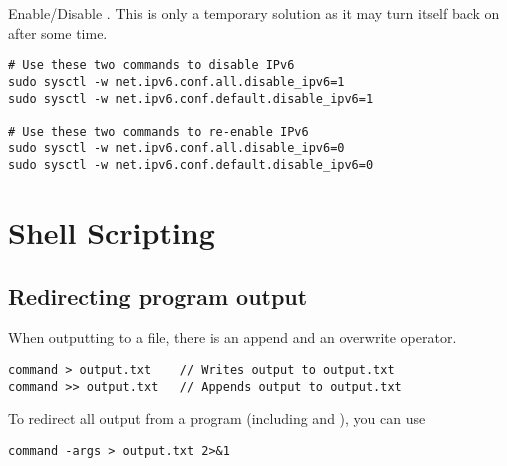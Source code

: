 Enable/Disable . This is only a temporary solution as it may turn itself back on after some time.
\begin{lstlisting}
# Use these two commands to disable IPv6
sudo sysctl -w net.ipv6.conf.all.disable_ipv6=1
sudo sysctl -w net.ipv6.conf.default.disable_ipv6=1

# Use these two commands to re-enable IPv6
sudo sysctl -w net.ipv6.conf.all.disable_ipv6=0
sudo sysctl -w net.ipv6.conf.default.disable_ipv6=0
\end{lstlisting}










\section{Shell Scripting}

\subsection{Redirecting program output}

When outputting to a file, there is an append and an overwrite operator.
\begin{lstlisting}
command > output.txt    // Writes output to output.txt
command >> output.txt   // Appends output to output.txt
\end{lstlisting}
To redirect all output from a program (including  and ), you can use 
\begin{lstlisting}
command -args > output.txt 2>&1
\end{lstlisting}

\lstset{language=Bash, style=shellstyle}

